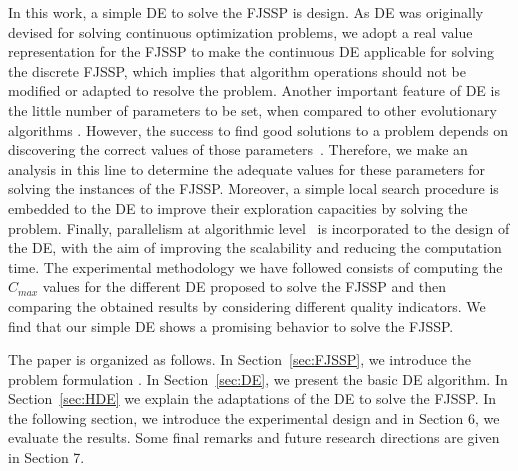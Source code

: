 \documentclass[runningheads,a4paper]{llncs}
\begin{document}
In this work, a simple DE to solve the FJSSP is design. As DE was originally devised for solving continuous optimization problems, we adopt a real value representation for the FJSSP  to make the continuous DE applicable for solving the discrete FJSSP, which implies that algorithm operations should not be modified or adapted to resolve the problem. Another important feature of DE is the little number of parameters to be set, when compared to other evolutionary algorithms%
. However, the success to find good solutions to a problem depends on discovering the correct values of those parameters~\cite{%
app8101945}. Therefore, we make an analysis in this line to determine the adequate values for these parameters for solving the instances of the FJSSP. Moreover, a simple local search procedure is embedded to the DE to improve their exploration capacities by solving the problem. Finally, parallelism at algorithmic level~\cite{Talbi} is incorporated to the design of the DE, with the aim of improving the scalability and reducing the computation time.  %
The experimental methodology we have followed consists of computing the $C_{max}$ values for the different DE proposed to solve the FJSSP and then comparing the obtained results by considering different quality indicators. We find that our simple DE shows a promising behavior to solve the FJSSP.%

The  paper is organized as follows. In Section~\ref{sec:FJSSP}, we introduce the problem formulation %
.  In Section~\ref{sec:DE}, we present the basic DE algorithm. In Section~\ref{sec:HDE} we explain the adaptations of the DE to solve the FJSSP. In the following section, we introduce the experimental design and in Section 6, we evaluate the results. %
Some final remarks and future research directions are given in Section 7.

\end{document}
